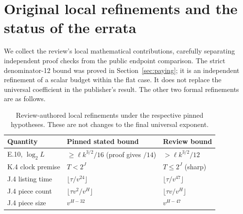 \documentclass[11pt,letterpaper]{article}
\theoremstyle{definition}\newtheorem{definition}[theorem]{Definition}\newtheorem{example}[theorem]{Example}
\theoremstyle{remark}\newtheorem{remark}[theorem]{Remark}
\begin{document}
\section{Original local refinements and the status of the errata}\label{sec:extensions}
We collect the review's local mathematical contributions, carefully separating independent proof checks from the public endpoint comparison. The strict denominator-12 bound was proved in Section~\ref{sec:paying}; it is an independent refinement of a scalar budget within the flat case. It does not replace the universal coefficient in the publisher's result. The other two formal refinements are as follows.

\begin{table}[H]
\centering\small
\caption{Review-authored local refinements under the respective pinned hypotheses. These are not changes to the final universal exponent.}\label{tab:local-refinements}
\begin{tabular}{@{}>{\raggedright\arraybackslash}p{.24\linewidth}>{\raggedright\arraybackslash}p{.35\linewidth}>{\raggedright\arraybackslash}p{.33\linewidth}@{}}\toprule
Quantity & Pinned stated bound & Review bound \\\midrule
E.10, $\log_2 L$ & $\ge\ell k^{3/2}/16$ (proof gives $/14$) & $>\ell k^{3/2}/12$\\
K.4 clock premise & $T<2^J$ & $T\le2^J$ (sharp)\\
J.4 listing time & $\lfloor\tau/v^{24}\rfloor$ & $\lfloor\tau/v^{47}\rfloor$\\
J.4 piece count & $\lfloor\tau v^2/v^H\rfloor$ & $\lfloor\tau v/v^H\rfloor$\\
J.4 piece size & $v^{H-32}$ & $v^{H-47}$\\
\bottomrule\end{tabular}
\end{table}
\end{document}

